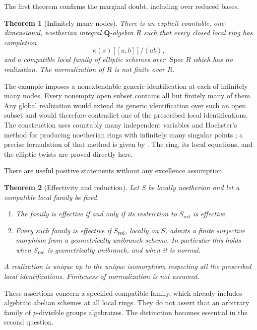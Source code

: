 \documentclass[11pt]{article}
\newtheorem{theorem}{Theorem}[section]
\theoremstyle{definition}\newtheorem{definition}[theorem]{Definition}
\theoremstyle{remark}\newtheorem{remark}[theorem]{Remark}
\newcommand{\Spec}{\operatorname{Spec}}
\begin{document}
The first theorem confirms the marginal doubt, including over reduced bases.

\begin{theorem}[Infinitely many nodes]\label{thm:nodes}
There is an explicit countable, one-dimensional, noetherian integral $\mathbf Q$-algebra $R$ such that every closed local ring has completion
\[
 \kappa(s)[[a,b]]/(ab),
\]
and a compatible local family of elliptic schemes over $\Spec R$ which has no realization. The normalization of $R$ is not finite over $R$.
\end{theorem}

The example imposes a nonextendable generic identification at each of infinitely many nodes. Every nonempty open subset contains all but finitely many of them. Any global realization would extend its generic identification over such an open subset and would therefore contradict one of the prescribed local identifications. The construction uses countably many independent variables and Hochster's method for producing noetherian rings with infinitely many singular points \citep{Hochster}; a precise formulation of that method is given by \citet[Theorem~3, p.~1]{DattaMurayama}. The ring, its local equations, and the elliptic twists are proved directly here.

There are useful positive statements without any excellence assumption.

\begin{theorem}[Effectivity and reduction]\label{thm:positive}
Let $S$ be locally noetherian and let a compatible local family be fixed.
\begin{enumerate}
\item The family is effective if and only if its restriction to $S_{\mathrm{red}}$ is effective.
\item Every such family is effective if $S_{\mathrm{red}}$, locally on $S$, admits a finite surjective morphism from a geometrically unibranch scheme. In particular this holds when $S_{\mathrm{red}}$ is geometrically unibranch, and when it is normal.
\end{enumerate}
A realization is unique up to the unique isomorphism respecting all the prescribed local identifications. Finiteness of normalization is not assumed.
\end{theorem}

These assertions concern a specified compatible family, which already includes algebraic abelian schemes at all local rings. They do not assert that an arbitrary family of $p$-divisible groups algebraizes. The distinction becomes essential in the second question.
\end{document}
